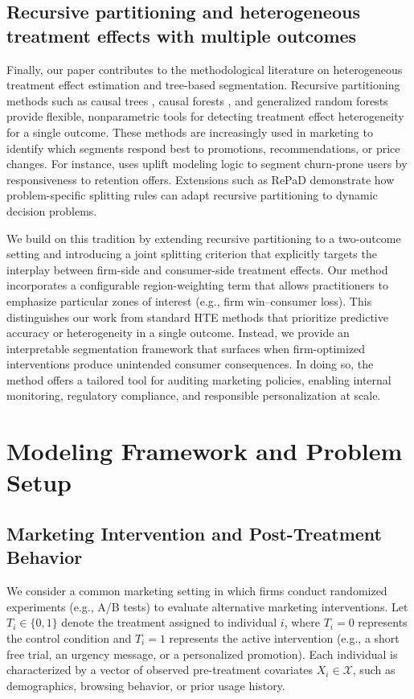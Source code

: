 \documentclass[11pt,letterpaper,english]{article}
\theoremstyle{definition}
\theoremstyle{definition}
\begin{document}
\begin{bibunit}
\subsection{Recursive partitioning and heterogeneous treatment effects with multiple outcomes}
Finally, our paper contributes to the methodological literature on heterogeneous treatment effect estimation and tree-based segmentation. Recursive partitioning methods such as causal trees \citep{athey2016recursive}, causal forests \citep{wager2018estimation}, and generalized random forests \citep{athey2019grf} provide flexible, nonparametric tools for detecting treatment effect heterogeneity for a single outcome. These methods are increasingly used in marketing to identify which segments respond best to promotions, recommendations, or price changes. For instance, \citet{ascarza2018retention} uses uplift modeling logic to segment churn-prone users by responsiveness to retention offers. Extensions such as RePaD \citep{barzegary2022recursive} demonstrate how problem-specific splitting rules can adapt recursive partitioning to dynamic decision problems.

We build on this tradition by extending recursive partitioning to a two-outcome setting and introducing a joint splitting criterion that explicitly targets the interplay between firm-side and consumer-side treatment effects. Our method incorporates a configurable region-weighting term that allows practitioners to emphasize particular zones of interest (e.g., firm win–consumer loss). This distinguishes our work from standard HTE methods that prioritize predictive accuracy or heterogeneity in a single outcome. Instead, we provide an interpretable segmentation framework that surfaces when firm-optimized interventions produce unintended consumer consequences. In doing so, the method offers a tailored tool for auditing marketing policies, enabling internal monitoring, regulatory compliance, and responsible personalization at scale.

\section{Modeling Framework and Problem Setup}
\label{sec:app}

\subsection{Marketing Intervention and Post-Treatment Behavior}

We consider a common marketing setting in which firms conduct randomized experiments (e.g., A/B tests) to evaluate alternative marketing interventions. Let $T_i \in \{0,1\}$ denote the treatment assigned to individual $i$, where $T_i=0$ represents the control condition and $T_i=1$ represents the active intervention (e.g., a short free trial, an urgency message, or a personalized promotion). Each individual is characterized by a vector of observed pre-treatment covariates $X_i \in \mathcal{X}$, such as demographics, browsing behavior, or prior usage history.


\end{bibunit}
\end{document}

